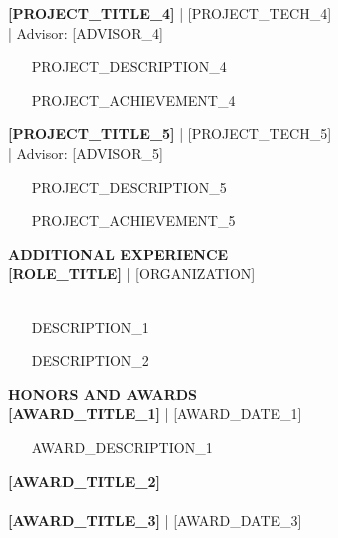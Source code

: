 \documentclass[11pt,a4paper]{article}
\begin{document}
\textbf{[PROJECT_TITLE\_4]} | [PROJECT_TECH\_4]\\
[PROJECT_DATES\_4] | Advisor: [ADVISOR\_4]\\
\begin{itemize}[leftmargin=*,noitemsep,topsep=2pt]
    \item [PROJECT_DESCRIPTION\_4]
    \item [PROJECT_ACHIEVEMENT\_4]
\end{itemize}

\textbf{[PROJECT_TITLE\_5]} | [PROJECT_TECH\_5]\\
[PROJECT_DATES\_5] | Advisor: [ADVISOR\_5]\\
\begin{itemize}[leftmargin=*,noitemsep,topsep=2pt]
    \item [PROJECT_DESCRIPTION\_5]
    \item [PROJECT_ACHIEVEMENT\_5]
\end{itemize}

\vspace{6pt}

\textbf{\large ADDITIONAL EXPERIENCE}\\
\textbf{[ROLE_TITLE]} | [ORGANIZATION]\\
[DATES]\\
\begin{itemize}[leftmargin=*,noitemsep,topsep=2pt]
    \item [DESCRIPTION\_1]
    \item [DESCRIPTION\_2]
\end{itemize}

\vspace{6pt}

\textbf{\large HONORS AND AWARDS}\\
\textbf{[AWARD_TITLE\_1]} | [AWARD_DATE\_1]\\
\begin{itemize}[leftmargin=*,noitemsep,topsep=2pt]
    \item [AWARD_DESCRIPTION\_1]
\end{itemize}

\textbf{[AWARD_TITLE\_2]}\\
[AWARD_DESCRIPTION\_2]\\

\textbf{[AWARD_TITLE\_3]} | [AWARD_DATE\_3]\\
[AWARD_DESCRIPTION\_3]\\

\vspace{6pt}
\end{document}
